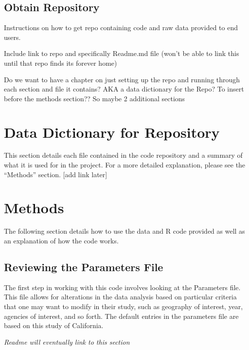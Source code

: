 \documentclass[
]{book}
\begin{document}
\hypertarget{obtain-repository}{%
\section{Obtain Repository}\label{obtain-repository}}

Instructions on how to get repo containing code and raw data provided to end users.

Include link to repo and specifically Readme.md file (won't be able to link this until that repo finds its forever home)

Do we want to have a chapter on just setting up the repo and running through each section and file it contains? AKA a data dictionary for the Repo? To insert before the methods section??
So maybe 2 additional sections

\hypertarget{data-dictionary-for-repository}{%
\chapter{Data Dictionary for Repository}\label{data-dictionary-for-repository}}

This section details each file contained in the code repository and a summary of what it is used for in the project. For a more detailed explanation, please see the ``Methods'' section. {[}add link later{]}

\hypertarget{methods}{%
\chapter{Methods}\label{methods}}

The following section details how to use the data and R code provided as well as an explanation of how the code works.

\hypertarget{reviewing-the-parameters-file}{%
\section{Reviewing the Parameters File}\label{reviewing-the-parameters-file}}

The first step in working with this code involves looking at the Parameters file. This file allows for alterations in the data analysis based on particular criteria that one may want to modify in their study, such as geography of interest, year, agencies of interest, and so forth. The default entries in the parameters file are based on this study of California.

\emph{Readme will eventually link to this section}
\end{document}
